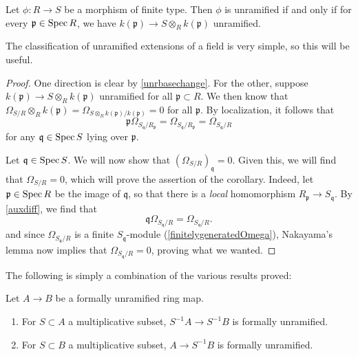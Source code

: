 \begin{proposition} \label{reduceunrtofield} 
Let $\phi: R \to S$ be a morphism of finite type. Then $\phi$ is unramified if
and only if for every $\mathfrak{p} \in \operatorname{Spec} R$, we have
\( k(\mathfrak{p}) \to S \otimes_R k(\mathfrak{p})  \)
unramified.
\end{proposition} 
The classification of unramified extensions of a field is very simple, so this
will be useful.
\begin{proof} 
One direction is clear by \cref{unrbasechange}. For the other, suppose
$k(\mathfrak{p}) \to S \otimes_R k(\mathfrak{p})$ unramified for all $\mathfrak{p} \subset R$.
We then know that 
\( \Omega_{S/R} \otimes_R k(\mathfrak{p}) = \Omega_{S \otimes_R
k(\mathfrak{p})/k(\mathfrak{p})} = 0  \)
for all $\mathfrak{p}$. By localization, it follows that
\begin{equation} \label{auxdiff} \mathfrak{p}
\Omega_{S_{\mathfrak{q}}/R_{\mathfrak{p}}} =
\Omega_{S_{\mathfrak{q}}/R_{\mathfrak{p}}} = \Omega_{S_{\mathfrak{q}}/R}  \end{equation}
for any $\mathfrak{q} \in \operatorname{Spec} S$ lying over $\mathfrak{p}$.

Let $\mathfrak{q} \in \operatorname{Spec} S$. We will now show that
$(\Omega_{S/R})_{\mathfrak{q}} = 0$. 
Given this, we will find that $\Omega_{S/R} =0$, which will prove the
assertion of the corollary. 
Indeed, let $\mathfrak{p} \in \operatorname{Spec} R$ be
the image of $\mathfrak{q}$, so that there is a \emph{local} homomorphism 
$R_{\mathfrak{p}} \to S_{\mathfrak{q}}$. By \eqref{auxdiff}, we find that
\[ \mathfrak{q} \Omega_{S_{\mathfrak{q}}/R} = \Omega_{S_{\mathfrak{q}}/R}.  \]
and since $\Omega_{S_{\mathfrak{q}}/R}$ is a finite $S_{\mathfrak{q}}$-module
(\cref{finitelygeneratedOmega}),
Nakayama's lemma now implies that $\Omega_{S_{\mathfrak{q}}/R}=0$, proving
what we wanted. 
\end{proof} 


The following is simply a combination of the various results proved:
\begin{corollary}
\label{lemma-formally-unramified-localize}
Let $A \to B$ be a formally unramified ring map.
\begin{enumerate}
\item For $S \subset A$ a multiplicative subset,
$S^{-1}A \to S^{-1}B$ is formally unramified.
\item For $S \subset B$ a multiplicative subset,
$A \to S^{-1}B$ is formally unramified.
\end{enumerate}
\end{corollary}

